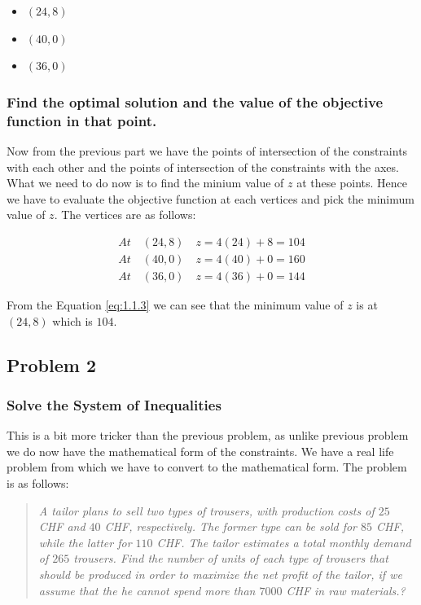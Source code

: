 \documentclass[unicode,11pt,a4paper,oneside,numbers=endperiod,openany]{scrartcl}
\begin{document}
\begin{itemize}
	\item $(24, 8)$
	\item $(40, 0)$
	\item $(36, 0)$
\end{itemize}

\subsubsection{ Find the optimal solution and the value of the objective function in that point.}
Now from the previous part we have the points of intersection of the constraints with each other and the points of intersection of the constraints with the axes. What we need to do now is to find the minium value of $z$ at these points. Hence we have to evaluate the objective function at each vertices and pick the minimum value of $z$. The vertices are as follows:

\begin{equation}
	\begin{aligned}
		At \quad (24, 8) \quad z = 4(24) + 8 = 104 \\
		At \quad (40, 0) \quad z = 4(40) + 0 = 160 \\
		At \quad (36, 0) \quad z = 4(36) + 0 = 144
	\end{aligned}
	\label{eq:1.1.3}
\end{equation}

From the Equation \ref{eq:1.1.3} we can see that the minimum value of $z$ is at $(24, 8)$ which is $104$.

\subsection{Problem 2}
\subsubsection{Solve the System of Inequalities}
This is a bit more tricker than the previous problem, as unlike previous problem we do now have the mathematical form of the constraints. We have a real life problem from which we have to convert to the mathematical form. The problem is as follows:

\begin{quote}
	\textit{A tailor plans to sell two types of trousers, with production costs of $25 $ CHF and $40$ CHF, respectively. The former type can be sold for $85$ CHF, while the latter for $110$ CHF. The tailor estimates a total monthly demand of $265$ trousers. Find the number of units of each type of trousers that should be produced in order to maximize the net proﬁt of the tailor, if we assume that the he cannot spend more than $7000$ CHF in raw materials.?}
\end{quote}
\end{document}

